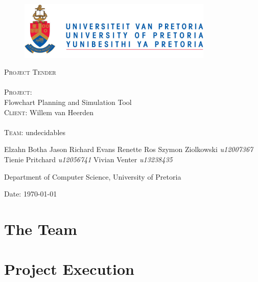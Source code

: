 \documentclass[12pt]{article}
\begin{document}
\begin{titlepage}
	\begin{center}
		
		\begin{figure}[t]
			\centering
			\includegraphics[width=350px]{UP_Logo.png}
		\end{figure}
		
		\textsc{\Huge Project Tender} \\ 

		\textsc{\huge \\Project:\\	}
		\huge Flowchart Planning and Simulation Tool
		\textsc{\Large \\Client:}
		\large Willem van Heerden \\

		\textsc{\huge \\ Team:}
		\huge \textsc{}undecidables\textsc{}
		\begin{flushright} \large
			Elzahn Botha 		\emph{} \newline
			Jason Richard Evans	\emph{} \newline
			Renette Ros			\emph{} \newline
			Szymon Ziolkowski	\emph{u12007367} \newline
			Tienie Pritchard 	\emph{u12056741} \newline
			Vivian Venter 		\emph{u13238435} \newline
		\end{flushright}
		\small Department of Computer Science, University of Pretoria \\

	\vfill

	{\large Date: \today}		
		
		
	\end{center}
\end{titlepage}

\newpage
\tableofcontents

\pagebreak

\section{The Team}


\section{Project Execution}

\end{document}
